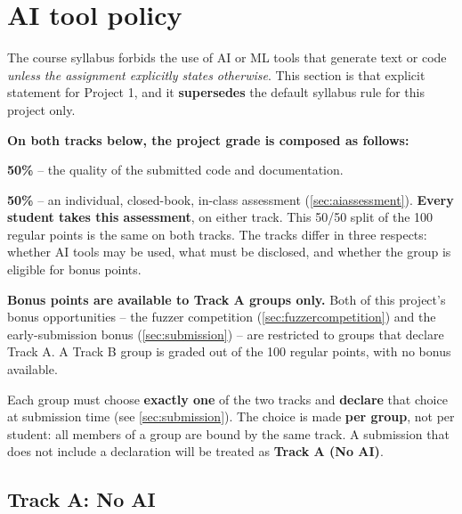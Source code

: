 \documentclass[letterpaper,11pt]{article}
\begin{document}


\section{AI tool policy}
\label{sec:aipolicy}

The course syllabus forbids the use of AI or ML tools that generate text or
code \emph{unless the assignment explicitly states otherwise}. This section is
that explicit statement for Project 1, and it \textbf{supersedes} the default
syllabus rule for this project only.

\textbf{On both tracks below, the project grade is composed as follows:}
\squishlist
 \item \textbf{50\%} -- the quality of the submitted code and documentation.
 \item \textbf{50\%} -- an individual, closed-book, in-class assessment
 (\autoref{sec:aiassessment}). \textbf{Every student takes this assessment},
 on either track.
\squishend
This 50/50 split of the 100 regular points is the same on both tracks. The
tracks differ in three respects: whether AI tools may be used, what must be
disclosed, and whether the group is eligible for bonus points.

\textbf{Bonus points are available to Track A groups only.} Both of this
project's bonus opportunities -- the fuzzer competition
(\autoref{sec:fuzzercompetition}) and the early-submission bonus
(\autoref{sec:submission}) -- are restricted to groups that declare Track A. A
Track B group is graded out of the 100 regular points, with no bonus available.

Each group must choose \textbf{exactly one} of the two tracks and
\textbf{declare} that choice at submission time (see \autoref{sec:submission}).
The choice is made \textbf{per group}, not per student: all members of a group
are bound by the same track. A submission that does not include a declaration
will be treated as \textbf{Track A (No AI)}.

\subsection{Track A: No AI}
\end{document}
